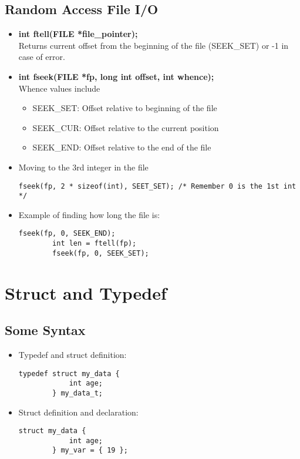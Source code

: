 \documentclass{article}
\begin{document}
\subsection{Random Access File I/O}
\begin{itemize}
    \item \textbf{int ftell(FILE *file\_pointer);}\\
    Returns current offset from the beginning of the file (SEEK\_SET) or -1 in case of error.
    \item \textbf{int fseek(FILE *fp, long int offset, int whence);}\\
    Whence values include
    \begin{itemize}
        \item SEEK\_SET: Offset relative to beginning of the file 
        \item SEEK\_CUR: Offset relative to the current position
        \item SEEK\_END: Offset relative to the end of the file
    \end{itemize}
    \item Moving to the 3rd integer in the file
    \begin{lstlisting}[style=CStyle]
    fseek(fp, 2 * sizeof(int), SEET_SET); /* Remember 0 is the 1st int */
    \end{lstlisting}
    \item Example of finding how long the file is:
    \begin{lstlisting}[style=CStyle]
        fseek(fp, 0, SEEK_END);
        int len = ftell(fp);
        fseek(fp, 0, SEEK_SET);
    \end{lstlisting}
\end{itemize}

\section{Struct and Typedef}

\subsection{Some Syntax}
\begin{itemize}
    \item Typedef and struct definition:
    \begin{lstlisting}[style=CStyle]
        typedef struct my_data {
            int age;
        } my_data_t;
    \end{lstlisting}
    \item Struct definition and declaration:
    \begin{lstlisting}[style=CStyle]
        struct my_data {
            int age;
        } my_var = { 19 };
    \end{lstlisting}
\end{itemize}
\end{document}
